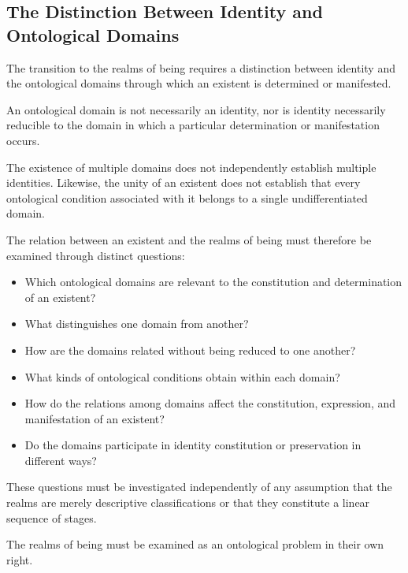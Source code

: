 
\subsection{The Distinction Between Identity and Ontological Domains}

The transition to the realms of being requires a
distinction between identity and the ontological
domains through which an existent is determined
or manifested.

An ontological domain is not necessarily an identity,
nor is identity necessarily reducible to the domain
in which a particular determination or manifestation
occurs.

The existence of multiple domains does not independently
establish multiple identities. Likewise, the unity of
an existent does not establish that every ontological
condition associated with it belongs to a single
undifferentiated domain.

The relation between an existent and the realms of
being must therefore be examined through distinct
questions:

\begin{itemize}
    \item Which ontological domains are relevant to
    the constitution and determination of an existent?
    \item What distinguishes one domain from another?
    \item How are the domains related without being
    reduced to one another?
    \item What kinds of ontological conditions obtain
    within each domain?
    \item How do the relations among domains affect
    the constitution, expression, and manifestation
    of an existent?
    \item Do the domains participate in identity
    constitution or preservation in different ways?
\end{itemize}

These questions must be investigated independently
of any assumption that the realms are merely
descriptive classifications or that they constitute
a linear sequence of stages.

The realms of being must be examined as an
ontological problem in their own right.

